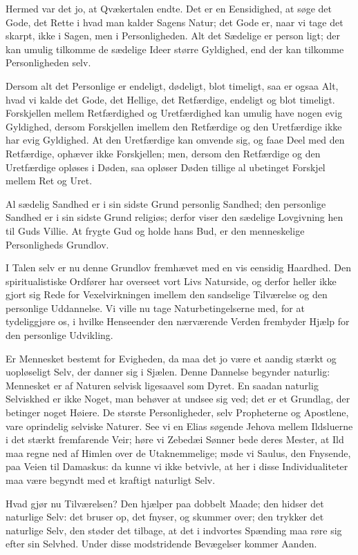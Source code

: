 \documentclass[12pt,a4paper]{book}
\newcommand{\apage}[1]{\marginnote{\footnotesize\textit{[#1]}}}
\begin{document}
Hermed var det jo, at Qvækertalen endte. Det er en Eensidighed, at søge
det Gode, det Rette i hvad man kalder Sagens Natur; det Gode er, naar vi
tage det skarpt, ikke i Sagen, men i Personligheden. Alt det Sædelige er
person\-%
ligt; der kan umulig tilkomme de sædelige Ideer større \apage{37} Gyldighed, end
der kan tilkomme Personligheden selv.

Dersom alt det Personlige er endeligt, dødeligt, blot timeligt, saa er
ogsaa Alt, hvad vi kalde det Gode, det Hellige, det Retfærdige, endeligt
og blot timeligt. Forskjellen mellem Retfærdighed og Uretfærdighed kan
umulig have nogen evig Gyldighed, dersom Forskjellen imellem den
Retfærdige og den Uretfærdige ikke har evig Gyldighed. At den
Uretfærdige kan omvende sig, og faae Deel med den Retfærdige, ophæver
ikke Forskjellen; men, dersom den Retfærdige og den Uretfærdige opløses
i Døden, saa opløser Døden tillige al ubetinget Forskjel mellem Ret og
Uret.

Al sædelig Sandhed er i sin sidste Grund personlig Sandhed; den
personlige Sandhed er i sin sidste Grund religiøs; derfor viser den
sædelige Lovgivning hen til Guds Villie. At frygte Gud og holde hans
Bud, er den menneskelige Personligheds Grundlov.

I Talen selv er nu denne Grundlov fremhævet med en vis eensidig
Haardhed. Den spiritualistiske Ordfører har overseet vort Livs
Naturside, og derfor heller ikke gjort sig Rede for Vexelvirkningen
imellem den sandselige Tilværelse og den personlige Uddannelse. Vi ville
nu tage Naturbetingelserne med, for at tydeliggjøre os, i hvilke
Henseender den nærværende Verden frembyder Hjælp for den personlige
Udvikling.

Er Mennesket bestemt for Evigheden, da maa det jo være et aandig stærkt
og uopløseligt Selv, der danner sig i Sjælen. Denne Dannelse begynder
naturlig: Mennesket er af Naturen selvisk ligesaavel som Dyret. En
saadan naturlig Selviskhed er ikke Noget, man behøver at undsee sig ved;
det er et Grundlag, der betinger noget Høiere. De største
Personligheder, selv Propheterne og Apostlene, vare oprindelig selviske
Naturer. See vi en Elias søgende Jehova mellem Ildsluerne i det stærkt
fremfarende Veir; høre vi Zebedæi Sønner bede deres Mester, at Ild maa
regne ned af Himlen over de Utaknemmelige; møde vi Saulus, den
Fnysende, paa Veien til \apage{38}
Damaskus: da kunne vi ikke betvivle, at her i disse Individualiteter maa
være begyndt med et kraftigt naturligt Selv.

Hvad gjør nu Tilværelsen? Den hjælper paa dobbelt Maade; den hidser det
naturlige Selv: det bruser op, det fnyser, og skummer over; den trykker
det naturlige Selv, den støder det tilbage, at det i indvortes Spænding
maa røre sig efter sin Selvhed. Under disse modstridende Bevægelser
kommer Aanden.
\end{document}
